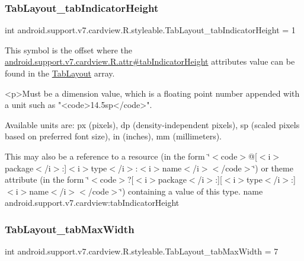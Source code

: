 \subsubsection{\texorpdfstring{Tab\+Layout\+\_\+tab\+Indicator\+Height}{TabLayout\_tabIndicatorHeight}}
{\footnotesize\ttfamily int android.\+support.\+v7.\+cardview.\+R.\+styleable.\+Tab\+Layout\+\_\+tab\+Indicator\+Height = 1\hspace{0.3cm}{\ttfamily [static]}}

This symbol is the offset where the \hyperlink{classandroid_1_1support_1_1v7_1_1cardview_1_1R_1_1attr_a612178f5edffc144a50fc472aa0f2dfe}{android.\+support.\+v7.\+cardview.\+R.\+attr\#tab\+Indicator\+Height} attribute\textquotesingle{}s value can be found in the \hyperlink{classandroid_1_1support_1_1v7_1_1cardview_1_1R_1_1styleable_afa0dc9366603eaec9e38d99273ba8512}{Tab\+Layout} array.

\begin{DoxyVerb}      <p>Must be a dimension value, which is a floating point number appended with a unit such as "<code>14.5sp</code>".
\end{DoxyVerb}
 Available units are\+: px (pixels), dp (density-\/independent pixels), sp (scaled pixels based on preferred font size), in (inches), mm (millimeters). 

This may also be a reference to a resource (in the form \char`\"{}$<$code$>$@\mbox{[}$<$i$>$package$<$/i$>$\+:\mbox{]}$<$i$>$type$<$/i$>$\+:$<$i$>$name$<$/i$>$$<$/code$>$\char`\"{}) or theme attribute (in the form \char`\"{}$<$code$>$?\mbox{[}$<$i$>$package$<$/i$>$\+:\mbox{]}\mbox{[}$<$i$>$type$<$/i$>$\+:\mbox{]}$<$i$>$name$<$/i$>$$<$/code$>$\char`\"{}) containing a value of this type.  name android.\+support.\+v7.\+cardview\+:tab\+Indicator\+Height \mbox{\label{classandroid_1_1support_1_1v7_1_1cardview_1_1R_1_1styleable_aad4a6769c12845096dbfe0535274c45c}} 
\subsubsection{\texorpdfstring{Tab\+Layout\+\_\+tab\+Max\+Width}{TabLayout\_tabMaxWidth}}
{\footnotesize\ttfamily int android.\+support.\+v7.\+cardview.\+R.\+styleable.\+Tab\+Layout\+\_\+tab\+Max\+Width = 7\hspace{0.3cm}{\ttfamily [static]}}

